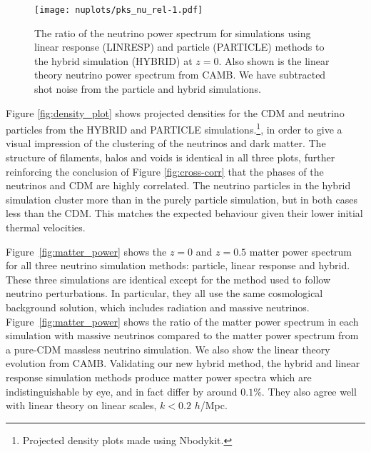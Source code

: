 \documentclass[useAMS, usenatbib]{mnras}
\begin{document}
\begin{figure}
\texttt{[image: nuplots/pks\_nu\_rel-1.pdf]}
  \caption{The ratio of the neutrino power spectrum for simulations using linear response (LINRESP) and particle (PARTICLE) methods to the hybrid simulation (HYBRID) at $z=0$. Also shown is the linear theory neutrino power spectrum from CAMB. We have subtracted shot noise from the particle and hybrid simulations.}
  \label{fig:rel_neutrino_power}
\end{figure}

Figure \ref{fig:density_plot} shows projected densities for the CDM and neutrino particles from the HYBRID and PARTICLE simulations.\footnote{Projected density plots made using Nbodykit.}, in order to give a visual impression of the clustering of the neutrinos and dark matter. The structure of filaments, halos and voids is identical in all three plots, further reinforcing the conclusion of Figure \ref{fig:cross-corr} that the phases of the neutrinos and CDM are highly correlated. The neutrino particles in the hybrid simulation cluster more than in the purely particle simulation, but in both cases less than the CDM. This matches the expected behaviour given their lower initial thermal velocities.

Figure~\ref{fig:matter_power} shows the $z=0$ and $z=0.5$ matter power spectrum for all three neutrino simulation methods: particle, linear response and hybrid. These three simulations are identical except for the method used to follow neutrino perturbations. In particular, they all use the same cosmological background solution, which includes radiation and massive neutrinos. Figure~\ref{fig:matter_power} shows the ratio of the matter power spectrum in each simulation with massive neutrinos compared to the matter power spectrum from a pure-CDM massless neutrino simulation. We also show the linear theory evolution from CAMB. Validating our new hybrid method, the hybrid and linear response simulation methods produce matter power spectra which are indistinguishable by eye, and in fact differ by around $0.1\%$. They also agree well with linear theory on linear scales, $k < 0.2$ $h$/Mpc.
\end{document}
